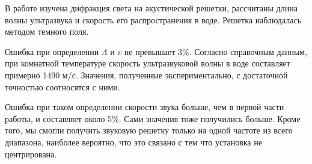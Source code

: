 \documentclass[a4paper,12pt]{article}
\begin{document}
В работе изучена дифракция света на акустической решетки, рассчитаны длина волны ультразвука и скорость его распространения в воде. Решетка наблюдалась методом
темного поля.

Ошибка при определении $ \Lambda $ и $ v $ не превышает 3\%. Согласно справочным данным, при комнатной температуре скорость ультразвуковой волны в воде составляет примерно 1490 м/с. Значения, полученные экспериментально, с достаточной точностью соотносятся с ними.

Ошибка при таком определении скорости звука больше, чем в первой части работы, и
составляет около 5\%. Сами значения тоже получились больше.
Кроме того, мы смогли получить звуковую решетку только на одной частоте из всего диапазона, наиболее вероятно, что это связано с тем что установка не центрирована.
\end{document}
